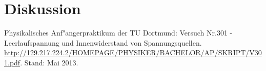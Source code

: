 \section{Diskussion}
\label{diskussion}

\begin{thebibliography}{9}
	 Physikalisches Anf"angerpraktikum der TU Dortmund: Versuch Nr.301 - Leerlaufspannung und Innenwiderstand von Spannungsquellen. \url{http://129.217.224.2/HOMEPAGE/PHYSIKER/BACHELOR/AP/SKRIPT/V301.pdf}. Stand: Mai 2013.
\end{thebibliography}
